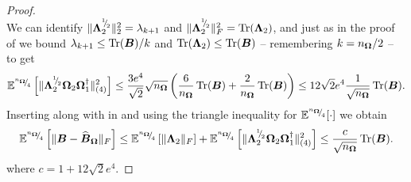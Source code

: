 \documentclass[12pt]{article}
\begin{document}
\begin{proof}
\begin{equation}
    \end{equation}
    We can identify $\lVert \boldsymbol{\Lambda}_2^{{}^{1}{\mskip -5mu/\mskip -3mu}_{2}} \rVert _2^2 = \lambda_{k+1}$ and $\lVert \boldsymbol{\Lambda}_2^{{}^{1}{\mskip -5mu/\mskip -3mu}_{2}} \rVert _F^2 = \operatorname{Tr}(\boldsymbol{\Lambda}_2)$, and just as in the proof of \cite[lemma 3.1]{meyer-2021-hutch-optimal} we bound $\lambda_{k+1} \leq \operatorname{Tr}(\boldsymbol{B})/k$ and $\operatorname{Tr}(\boldsymbol{\Lambda}_2) \leq \operatorname{Tr}(\boldsymbol{B})$ -- remembering $k = n_{\boldsymbol{\Omega}}/2$ -- to get 
    \begin{equation}
        \mathbb{E}^{{}^{n_{\boldsymbol{\Omega}}}{\mskip -5mu/\mskip -3mu}_{4}}\left[ \lVert \boldsymbol{\Lambda}_2^{{}^{1}{\mskip -5mu/\mskip -3mu}_{2}} \boldsymbol{\Omega}_2 \boldsymbol{\Omega}_1^{\dagger} \rVert _{(4)}^2 \right]
        \leq \frac{3 e^4}{\sqrt{2}}  \sqrt{n_{\boldsymbol{\Omega}}} \left( \frac{6}{n_{\boldsymbol{\Omega}}} \operatorname{Tr}(\boldsymbol{B}) + \frac{2}{n_{\boldsymbol{\Omega}}} \operatorname{Tr}(\boldsymbol{B}) \right)
        \leq 12 \sqrt{2} e^4 \frac{1}{\sqrt{n_{\boldsymbol{\Omega}}}} \operatorname{Tr}(\boldsymbol{B}).
        \label{equ:nystrom-proof-tail-bound}
    \end{equation}
    Inserting  along with  in  and using the triangle inequality for $\mathbb{E}^{{}^{n_{\boldsymbol{\Omega}}}{\mskip -5mu/\mskip -3mu}_{4}}[\cdot]$ we obtain
    \begin{equation}
        \mathbb{E}^{{}^{n_{\boldsymbol{\Omega}}}{\mskip -5mu/\mskip -3mu}_{4}} \left[\lVert \boldsymbol{B} - \widehat{\boldsymbol{B}}_{\boldsymbol{\Omega}} \rVert _F \right]
        \leq \mathbb{E}^{{}^{n_{\boldsymbol{\Omega}}}{\mskip -5mu/\mskip -3mu}_{4}} \left[ \lVert \boldsymbol{\Lambda}_2 \rVert _F \right] + \mathbb{E}^{{}^{n_{\boldsymbol{\Omega}}}{\mskip -5mu/\mskip -3mu}_{4}} \left[ \lVert \boldsymbol{\Lambda}_2^{{}^{1}{\mskip -5mu/\mskip -3mu}_{2}} \boldsymbol{\Omega}_2 \boldsymbol{\Omega}_1^{\dagger} \rVert _{(4)}^2 \right]
        \leq \frac{c}{\sqrt{n_{\boldsymbol{\Omega}}}} \operatorname{Tr}(\boldsymbol{B}).
    \end{equation}
    where $c = 1 + 12 \sqrt{2} e^4 $.


\end{proof}
\end{document}
